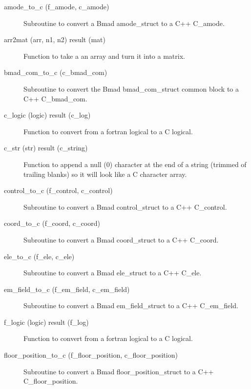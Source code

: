 \begin{description}

\item[amode\_to\_c (f\_amode, c\_amode)] \Newline 
Subroutine to convert a Bmad amode\_struct to a C++ C\_amode.

\item[arr2mat (arr, n1, n2) result (mat)] \Newline 
Function to take a an array and turn it into a matrix.

\item[bmad\_com\_to\_c (c\_bmad\_com)] \Newline 
Subroutine to convert the Bmad bmad\_com\_struct common block to 
a C++ C\_bmad\_com.

\item[c\_logic (logic) result (c\_log)] \Newline 
Function to convert from a fortran logical to a C logical.

\item[c\_str (str) result (c\_string)] \Newline 
Function to append a null (0) character at the end of a string (trimmed
of trailing blanks) so it will look like a C character array. 

\item[control\_to\_c (f\_control, c\_control)] \Newline 
Subroutine to convert a Bmad control\_struct to a C++ C\_control.

\item[coord\_to\_c (f\_coord, c\_coord)] \Newline 
Subroutine to convert a Bmad coord\_struct to a C++ C\_coord.

\item[ele\_to\_c (f\_ele, c\_ele)] \Newline 
Subroutine to convert a Bmad ele\_struct to a C++ C\_ele.

\item[em\_field\_to\_c (f\_em\_field, c\_em\_field)] \Newline 
Subroutine to convert a Bmad em\_field\_struct to a C++ C\_em\_field.

\item[f\_logic (logic) result (f\_log)] \Newline 
Function to convert from a fortran logical to a C logical.

\item[floor\_position\_to\_c (f\_floor\_position, c\_floor\_position)] \Newline 
Subroutine to convert a Bmad floor\_position\_struct to a C++ C\_floor\_position.


\end{description}
